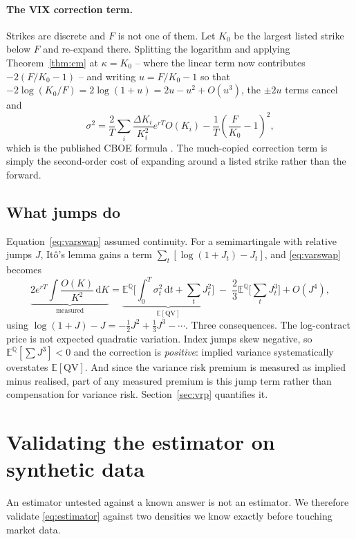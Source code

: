 \documentclass[11pt,a4paper]{article}
\theoremstyle{remark}
\newcommand{\Q}{\mathbb{Q}}
\newcommand{\E}{\mathbb{E}}
\newcommand{\dd}{\,\mathrm{d}}
\begin{document}
\paragraph{The VIX correction term.} Strikes are discrete and $F$ is not one of
them. Let $K_0$ be the largest listed strike below $F$ and re-expand there.
Splitting the logarithm and applying Theorem~\ref{thm:cm} at $\kappa=K_0$ --
where the linear term now contributes $-2(F/K_0-1)$ -- and writing
$u = F/K_0-1$ so that $-2\log(K_0/F) = 2\log(1+u) = 2u - u^2 + O(u^3)$, the
$\pm 2u$ terms cancel and
\begin{equation}
\label{eq:vix}
\sigma^2 = \frac{2}{T}\sum_i \frac{\Delta K_i}{K_i^2}e^{rT}O(K_i)
- \frac{1}{T}\left(\frac{F}{K_0}-1\right)^2,
\end{equation}
which is the published CBOE formula \citep{cboe2019}. The much-copied
correction term is simply the second-order cost of expanding around a listed
strike rather than the forward.

\subsection{What jumps do}
\label{sec:jumps}

Equation~\eqref{eq:varswap} assumed continuity. For a semimartingale with
relative jumps $J$, It\^o's lemma gains a term
$\sum_t[\log(1+J_t)-J_t]$, and \eqref{eq:varswap} becomes
\begin{equation}
\label{eq:jump}
\underbrace{2e^{rT}\!\int\!\frac{O(K)}{K^2}\dd K}_{\text{measured}}
= \underbrace{\E^\Q\!\Big[\int_0^T\!\sigma_t^2\dd t + \sum_t J_t^2\Big]}_{\E[\text{QV}]}
\;-\;\frac{2}{3}\E^\Q\!\Big[\sum_t J_t^3\Big] + O(J^4),
\end{equation}
using $\log(1+J)-J = -\tfrac12 J^2 + \tfrac13 J^3 - \cdots$. Three consequences.
The log-contract price is not expected quadratic variation. Index jumps skew
negative, so $\E^\Q[\sum J^3]<0$ and the correction is \emph{positive}: implied
variance systematically overstates $\E[\text{QV}]$. And since the variance risk
premium is measured as implied minus realised, part of any measured premium is
this jump term rather than compensation for variance risk. Section~\ref{sec:vrp}
quantifies it.

\section{Validating the estimator on synthetic data}
\label{sec:synth}

An estimator untested against a known answer is not an estimator. We therefore
validate \eqref{eq:estimator} against two densities we know exactly before
touching market data.
\end{document}
